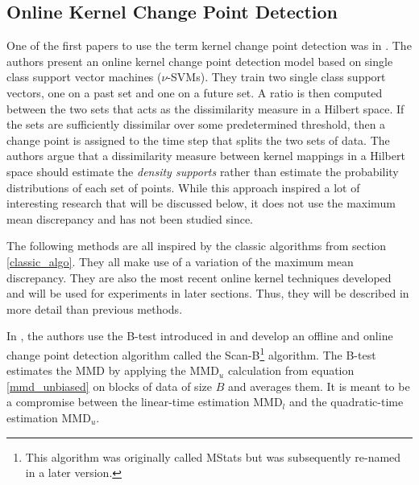 \subsection{Online Kernel Change Point Detection}
One of the first papers to use the term kernel change point detection was in \cite{desobry2005online}. The authors present an online kernel change point detection model based on single class support vector machines ($\nu$-SVMs). They train two single class support vectors, one on a past set and one on a future set. A ratio is then computed between the two sets that acts as the dissimilarity measure in a Hilbert space. If the sets are sufficiently dissimilar over some predetermined threshold, then a change point is assigned to the time step that splits the two sets of data. The authors argue that a dissimilarity measure between kernel mappings in a Hilbert space should estimate the \textit{density supports} rather than estimate the probability distributions of each set of points. While this approach inspired a lot of interesting research that will be discussed below, it does not use the maximum mean discrepancy and has not been studied since.

The following methods are all inspired by the classic algorithms from section \ref{classic_algo}. They all make use of a variation of the maximum mean discrepancy. They are also the most recent online kernel techniques developed and will be used for experiments in later sections. Thus, they will be described in more detail than previous methods.

In  \cite{li2015m}, the authors use the B-test introduced in \cite{zaremba2013b} and develop an offline and online change point detection algorithm called the Scan-B\footnote{This algorithm was originally called MStats but was subsequently re-named in a later version.} algorithm. The B-test estimates the MMD by applying the MMD$_u$ calculation from equation \ref{mmd_unbiased} on blocks of data of size $B$ and averages them. It is meant to be a compromise between the linear-time estimation MMD$_l$ and the quadratic-time estimation MMD$_u$.


